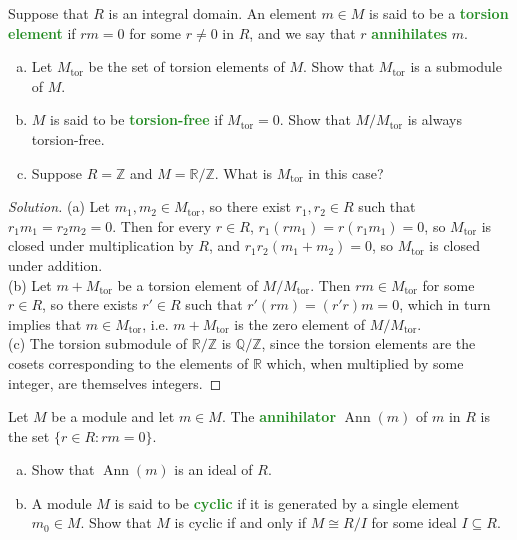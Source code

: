 \documentclass[10pt]{article}
\providecommand{\QQ}{\mathbb Q}
\providecommand{\RR}{\mathbb R}
\providecommand{\ZZ}{\mathbb Z}
\providecommand{\ii}{\item}
\newenvironment{soln}{\begin{proof}[Solution]}{\end{proof}}
\providecommand{\ann}{\operatorname{Ann}}
\providecommand{\vocab}[1]{{\textbf{\textcolor{ForestGreen}{#1}}}}
\begin{document}
\begin{problem}
    Suppose that $R$ is an integral domain.
    An element $m\in M$ is said to be a \vocab{torsion element}
    if $rm = 0$ for some $r\ne 0$ in $R$, and we say that
    $r$ \vocab{annihilates} $m$.
    \begin{enumerate}[(a)]
	\ii Let $M_{\text{tor}}$ be the set of torsion elements of $M$.
	Show that $M_{\text{tor}}$ is a submodule of $M$.
	\ii $M$ is said to be \vocab{torsion-free} if $M_{\text{tor}} = 0$.
	Show that $M/M_{\text{tor}}$ is always torsion-free.
	\ii Suppose $R = \ZZ$ and $M = \RR/\ZZ$.
	What is $M_{\text{tor}}$ in this case?
    \end{enumerate}
\end{problem}

\begin{soln}
    (a) Let $m_1,m_2\in M_{\text{tor}}$, so there exist
    $r_1,r_2\in R$ such that $r_1m_1 = r_2m_2 = 0$.
    Then for every $r\in R$, $r_1(rm_1) = r(r_1m_1) = 0$,
    so $M_{\text{tor}}$ is closed under multiplication by $R$,
    and $r_1r_2(m_1 + m_2) = 0$, so $M_{\text{tor}}$
    is closed under addition.
    \\

    (b) Let $m + M_{\text{tor}}$ be a torsion element of $M/M_{\text{tor}}$.
    Then $rm \in M_{\text{tor}}$ for some $r\in R$,
    so there exists $r'\in R$ such that $r'(rm) =(r'r)m = 0$,
    which in turn implies that $m\in M_{\text{tor}}$,
    i.e. $m + M_{\text{tor}}$ is the zero element of $M/M_{\text{tor}}$.
    \\

    (c) The torsion submodule of $\RR/\ZZ$ is $\QQ/\ZZ$,
    since the torsion elements are the cosets corresponding to
    the elements of $\RR$ which, when multiplied by some integer,
    are themselves integers.
\end{soln}

\begin{problem}
    Let $M$ be a module and let $m\in M$.
    The \vocab{annihilator} $\operatorname{Ann}(m)$ of $m$ in $R$
    is the set $\{r\in R : rm = 0\}$.
    \begin{enumerate}[(a)]
        \ii Show that $\ann(m)$ is an ideal of $R$.
	\ii A module $M$ is said to be \vocab{cyclic}
	if it is generated by a single element $m_0\in M$.
	Show that $M$ is cyclic if and only if $M\cong R/I$
	for some ideal $I\subseteq R$.
    \end{enumerate}
\end{problem}
\end{document}
